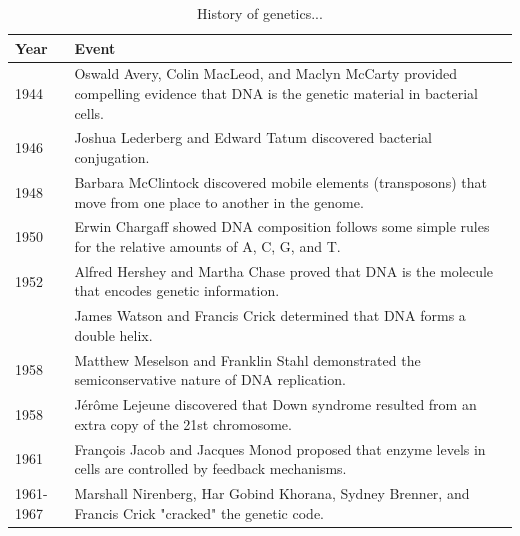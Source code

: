 \documentclass[11pt,ignorenonframetext,aspectratio=169]{beamer}
\begin{document}
\begin{frame}{}
\protect\hypertarget{section-13}{}
\begin{table}

\caption{\label{tab:history-table2}History of genetics...}
\centering
\fontsize{8}{10}\selectfont
\begin{tabular}[t]{l>{\raggedright\arraybackslash}p{40em}}
\toprule
Year & Event\\
\midrule
\rowcolor{gray!6}  1944 & Oswald Avery, Colin MacLeod, and Maclyn McCarty provided compelling evidence that DNA is the genetic material in bacterial cells.\\
1946 & Joshua Lederberg and Edward Tatum discovered bacterial conjugation.\\
\rowcolor{gray!6}  1948 & Barbara McClintock discovered mobile elements (transposons) that move from one place to another in the genome.\\
1950 & Erwin Chargaff showed DNA composition follows some simple rules for the relative amounts of A, C, G, and T.\\
\rowcolor{gray!6}  1952 & Alfred Hershey and Martha Chase proved that DNA is the molecule that encodes genetic information.\\
\addlinespace
1953 & James Watson and Francis Crick determined that DNA forms a double helix.\\
\rowcolor{gray!6}  1958 & Matthew Meselson and Franklin Stahl demonstrated the semiconservative nature of DNA replication.\\
1958 & Jérôme Lejeune discovered that Down syndrome resulted from an extra copy of the 21st chromosome.\\
\rowcolor{gray!6}  1961 & François Jacob and Jacques Monod proposed that enzyme levels in cells are controlled by feedback mechanisms.\\
1961-1967 & Marshall Nirenberg, Har Gobind Khorana, Sydney Brenner, and Francis Crick "cracked" the genetic code.\\
\bottomrule
\end{tabular}
\end{table}
\end{frame}
\end{document}
